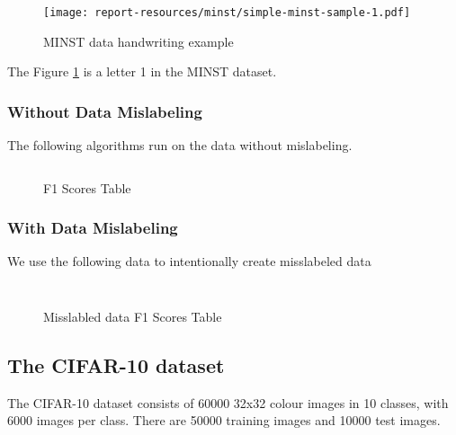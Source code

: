 \documentclass{article}
\begin{document}
\inputminted[firstline=16,lastline=20,frame=single,framesep=10pt,fontsize=\footnotesize]{python}{minst/main.py}

\begin{figure}[H]
    \centering
    \texttt{[image: report-resources/minst/simple-minst-sample-1.pdf]}
    \caption{MINST data handwriting example}
    \label{fig:let1}
\end{figure}

The Figure \ref{fig:let1} is a letter 1 in the MINST dataset. 

\subsubsection{Without Data Mislabeling}

The following algorithms run on the data without mislabeling. 

\inputminted[firstline=30,lastline=77,frame=single,framesep=10pt,fontsize=\footnotesize]{python}{minst/main.py}

\begin{figure}[H]
    \centering
    
    \caption{F1 Scores Table}
\end{figure}


\subsubsection{With Data Mislabeling}

We use the following data to intentionally create misslabeled data

\inputminted[frame=single,framesep=10pt,fontsize=\footnotesize]{python}{minst/do_miss_label.py}


\inputminted[firstline=93,lastline=142,frame=single,framesep=10pt,fontsize=\footnotesize]{python}{minst/main.py}


\begin{figure}[H]
    \centering
    
    \caption{Misslabled data F1 Scores Table}
\end{figure}

\subsection{The CIFAR-10 dataset}
The CIFAR-10 dataset consists of 60000 32x32 colour images in 10 classes, with 6000 images per class. There are 50000 training images and 10000 test images.
\end{document}
